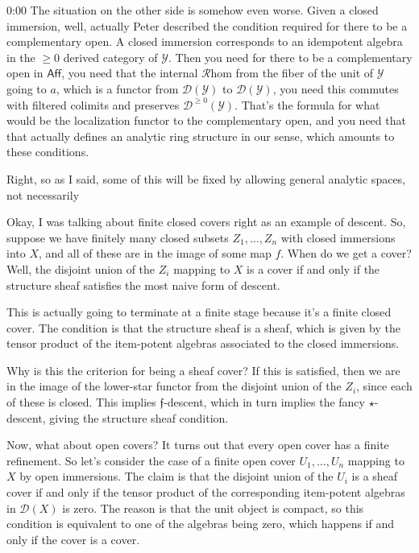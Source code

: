 \begin{unfinished}{0:00}
The situation on the other side is somehow even worse. Given a closed immersion, well, actually Peter described the condition required for there to be a complementary open. A closed immersion corresponds to an idempotent algebra in the $\geq 0$ derived category of $\mathscr{Y}$. Then you need for there to be a complementary open in $\mathsf{Aff}$, you need that the internal $\mathcal{R}\mathrm{hom}$ from the fiber of the unit of $\mathscr{Y}$ going to $a$, which is a functor from $\mathcal{D}(\mathscr{Y})$ to $\mathcal{D}(\mathscr{Y})$, you need this commutes with filtered colimits and preserves $\mathcal{D}^{\geq 0}(\mathscr{Y})$. That's the formula for what would be the localization functor to the complementary open, and you need that that actually defines an analytic ring structure in our sense, which amounts to these conditions.

Right, so as I said, some of this will be fixed by allowing general analytic spaces, not necessarily

Okay, I was talking about finite closed covers right as an example of descent. So, suppose we have finitely many closed subsets $Z_1, \dots, Z_n$ with closed immersions into $X$, and all of these are in the image of some map $f$. When do we get a cover? Well, the disjoint union of the $Z_i$ mapping to $X$ is a cover if and only if the structure sheaf satisfies the most naive form of descent. 

This is actually going to terminate at a finite stage because it's a finite closed cover. The condition is that the structure sheaf is a sheaf, which is given by the tensor product of the item-potent algebras associated to the closed immersions. 

Why is this the criterion for being a sheaf cover? If this is satisfied, then we are in the image of the lower-star functor from the disjoint union of the $Z_i$, since each of these is closed. This implies $\mathfrak{f}$-descent, which in turn implies the fancy $\star$-descent, giving the structure sheaf condition.

Now, what about open covers? It turns out that every open cover has a finite refinement. So let's consider the case of a finite open cover $U_1, \dots, U_n$ mapping to $X$ by open immersions. The claim is that the disjoint union of the $U_i$ is a sheaf cover if and only if the tensor product of the corresponding item-potent algebras in $\mathcal{D}(X)$ is zero. The reason is that the unit object is compact, so this condition is equivalent to one of the algebras being zero, which happens if and only if the cover is a cover.


\end{unfinished}
